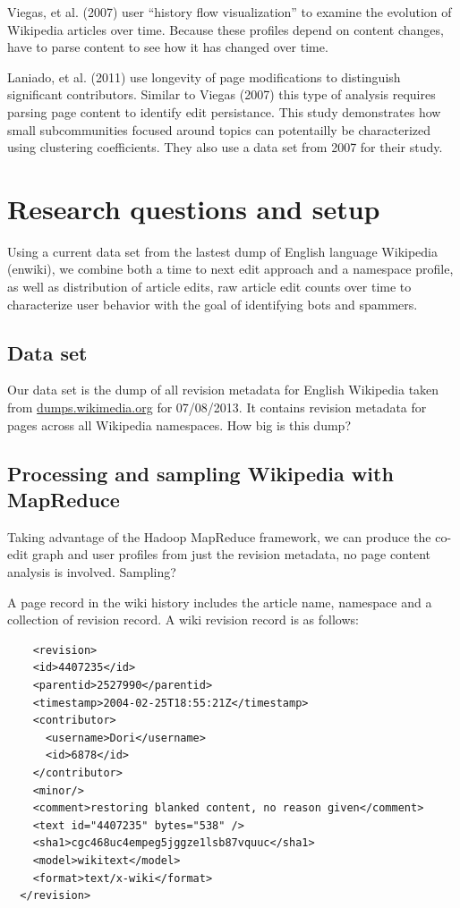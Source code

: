 \documentclass{article}
\begin{document}
Viegas, et al. (2007) user ``history flow visualization'' to examine the evolution of Wikipedia articles over time. Because these profiles depend on content changes, have to parse content to see how it has changed over time.

Laniado, et al. (2011) use longevity of page modifications to distinguish significant contributors. Similar to Viegas (2007) this type of analysis requires parsing page content to identify edit persistance. This study demonstrates how small subcommunities focused around topics can potentailly be characterized using clustering coefficients. They also use a data set from 2007 for their study.

\section{Research questions and setup}
Using a current data set from the lastest dump of English language Wikipedia (enwiki), we combine both a time to next edit approach and a namespace profile, as well as distribution of article edits, raw article edit counts over time to characterize user behavior with the goal of identifying bots and spammers.


\subsection{Data set} 
Our data set is the dump of all revision metadata for English Wikipedia taken from \url{dumps.wikimedia.org} for 07/08/2013. It contains revision metadata for pages across all Wikipedia namespaces.  How big is this dump? 

\subsection{Processing and sampling Wikipedia with MapReduce}

Taking advantage of the Hadoop MapReduce framework, we can produce the co-edit graph and user profiles from just the revision metadata, no page content analysis is involved. Sampling?

A page record in the wiki history includes the article name, namespace and a collection of revision record. A wiki revision record is as follows:
\begin{verbatim}
    <revision>
    <id>4407235</id>
    <parentid>2527990</parentid>
    <timestamp>2004-02-25T18:55:21Z</timestamp>
    <contributor>
      <username>Dori</username>
      <id>6878</id>
    </contributor>
    <minor/>
    <comment>restoring blanked content, no reason given</comment>
    <text id="4407235" bytes="538" />
    <sha1>cgc468uc4empeg5jggze1lsb87vquuc</sha1>
    <model>wikitext</model>
    <format>text/x-wiki</format>
  </revision>
\end{verbatim}
\end{document}
